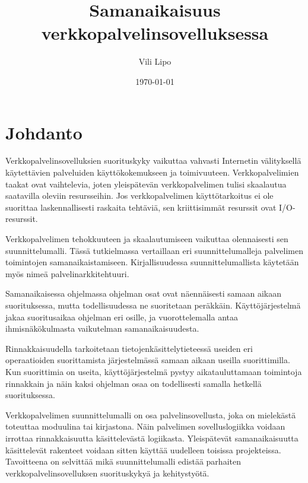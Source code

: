 \documentclass[finnish]{tktltiki2}%
\title{Samanaikaisuus verkkopalvelinsovelluksessa}
\author{Vili Lipo}
\date{\today}
\theoremstyle{definition}
\theoremstyle{remark}
\begin{document}
\frontmatter      %

\maketitle        %
\makeabstract     %

\tableofcontents  %


\mainmatter       %

\section{Johdanto}
Verkkopalvelinsovelluksien suorituskyky vaikuttaa vahvasti
Internetin välityksellä käytettävien palveluiden käyttökokemukseen ja toimivuuteen.
Verkkopalvelimien taakat ovat vaihtelevia, joten
yleispätevän verkkopalvelimen tulisi skaalautua saatavilla oleviin resursseihin.
Jos verkkopalvelimen käyttötarkoitus ei ole suorittaa laskennallisesti raskaita
tehtäviä, sen
kriittisimmät resurssit ovat I/O-resurssit.

Verkkopalvelimen tehokkuuteen ja skaalautumiseen vaikuttaa olennaisesti
sen suunnittelumalli. Tässä
tutkielmassa vertaillaan eri suunnittelumalleja palvelimen toimintojen samanaikaistamiseen.
Kirjallisuudessa suunnittelumallista käytetään myös nimeä palvelinarkkitehtuuri.

Samanaikaisessa ohjelmassa ohjelman osat ovat näennäisesti samaan
aikaan suorituksessa, mutta todellisuudessa ne suoritetaan peräkkäin.
Käyttöjärjestelmä jakaa suoritusaikaa ohjelman eri osille,
ja vuorottelemalla antaa ihmisnäkökulmasta vaikutelman samanaikaisuudesta.

Rinnakkaisuudella tarkoitetaan tietojenkäsittelytieteessä useiden
eri operaatioiden suorittamista järjestelmässä samaan aikaan useilla suorittimilla.
Kun suorittimia
on useita, käyttöjärjestelmä pystyy aikatauluttamaan toimintoja
rinnakkain ja näin kaksi ohjelman osaa on todellisesti
samalla hetkellä suorituksessa.

Verkkopalvelimen suunnittelumalli on osa palvelinsovellusta,
joka on mielekästä toteuttaa moduulina tai kirjastona.
Näin palvelimen sovelluslogiikka voidaan irrottaa rinnakkaisuutta
käsittelevästä logiikasta. Yleispätevät
samanaikaisuutta käsittelevät rakenteet voidaan sitten
käyttää uudelleen toisissa projekteissa.
Tavoitteena on selvittää mikä suunnittelumalli edistää
parhaiten verkkopalvelinsovelluksen suorituskykyä ja
kehitystyötä.
\end{document}
